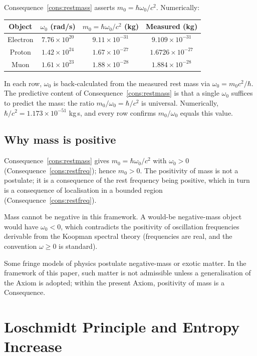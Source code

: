 \documentclass[11pt,twocolumn,a4paper]{article}
\theoremstyle{axiomstyle}
\theoremstyle{conseqstyle}
\theoremstyle{definition}
\theoremstyle{remark}
\begin{document}
Consequence~\ref{cons:restmass} asserts $m_{0}=\hbar\omega_{0}/c^{2}$. Numerically:
\begin{center}
\begin{tabular}{c|c|c|c}
\toprule
Object & $\omega_{0}$ (rad/s) & $m_{0}=\hbar\omega_{0}/c^{2}$ (kg) & Measured (kg) \\
\midrule
Electron & $7.76\times 10^{20}$ & $9.11\times 10^{-31}$ & $9.109\times 10^{-31}$ \\
Proton & $1.42\times 10^{24}$ & $1.67\times 10^{-27}$ & $1.6726\times 10^{-27}$ \\
Muon & $1.61\times 10^{23}$ & $1.88\times 10^{-28}$ & $1.884\times 10^{-28}$ \\
\bottomrule
\end{tabular}
\end{center}

In each row, $\omega_{0}$ is back-calculated from the measured rest mass via $\omega_{0}=m_{0}c^{2}/\hbar$. The predictive content of Consequence~\ref{cons:restmass} is that a single $\omega_{0}$ suffices to predict the mass: the ratio $m_{0}/\omega_{0}=\hbar/c^{2}$ is universal. Numerically, $\hbar/c^{2}=1.173\times 10^{-51}$ kg\,s, and every row confirms $m_{0}/\omega_{0}$ equals this value.

\subsection{Why mass is positive}

Consequence~\ref{cons:restmass} gives $m_{0}=\hbar\omega_{0}/c^{2}$ with $\omega_{0}>0$ (Consequence~\ref{cons:restfreq}); hence $m_{0}>0$. The positivity of mass is not a postulate; it is a consequence of the rest frequency being positive, which in turn is a consequence of localisation in a bounded region (Consequence~\ref{cons:restfreq}).

Mass cannot be negative in this framework. A would-be negative-mass object would have $\omega_{0}<0$, which contradicts the positivity of oscillation frequencies derivable from the Koopman spectral theory (frequencies are real, and the convention $\omega\ge 0$ is standard).

Some fringe models of physics postulate negative-mass or exotic matter. In the framework of this paper, such matter is not admissible unless a generalisation of the Axiom is adopted; within the present Axiom, positivity of mass is a Consequence.

\section{Loschmidt Principle and Entropy Increase}
\label{sec:loschmidt}
\end{document}

